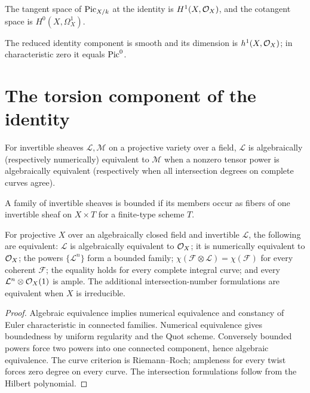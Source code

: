 \begin{proposition}\label{fga-prop-9-5-19}
The tangent space of $\operatorname{Pic}_{X/k}$ at the identity is $H^1(X,\mathcal O_X)$, and the
cotangent space is $H^0(X,\Omega_X^1)$.
\end{proposition}
\begin{proposition}\label{fga-prop-9-5-20}
The reduced identity component is smooth and its dimension is
$h^1(X,\mathcal O_X)$; in characteristic zero it equals $\operatorname{Pic}^0$.
\end{proposition}

\section{The torsion component of the identity}
\begin{definition}\label{fga-def-9-6-1}\uses{}
For invertible sheaves $\mathcal L,\mathcal M$ on a projective variety over a
field, $\mathcal L$ is algebraically (respectively numerically) equivalent to
$\mathcal M$ when a nonzero tensor power is algebraically equivalent
(respectively when all intersection degrees on complete curves agree).
\end{definition}\begin{definition}\label{fga-def-9-6-2}\uses{}
A family of invertible sheaves is bounded if its members occur as fibers of one
invertible sheaf on $X\times T$ for a finite-type scheme $T$.
\end{definition}\begin{theorem}\label{fga-thm-9-6-3}
For projective $X$ over an algebraically closed field and invertible $\mathcal L$,
the following are equivalent: $\mathcal L$ is algebraically equivalent to
$\mathcal O_X$; it is numerically equivalent to $\mathcal O_X$; the powers $\{\mathcal L^n\}$
form a bounded family; $\chi(\mathcal F\otimes\mathcal L)=\chi(\mathcal F)$
for every coherent $\mathcal F$; the equality holds for every complete integral
curve; and every $\mathcal L^n\otimes\mathcal O_X(1)$ is ample.  The additional
intersection-number formulations are equivalent when $X$ is
irreducible.
\end{theorem}
\begin{proof}
Algebraic equivalence implies numerical equivalence and constancy of Euler
characteristic in connected families.  Numerical equivalence gives boundedness
by uniform regularity and the Quot scheme.  Conversely bounded powers force two
powers into one connected component, hence algebraic equivalence.  The curve
criterion is Riemann--Roch; ampleness for every twist forces zero degree on every
curve.  The intersection formulations follow from the Hilbert polynomial.
\end{proof}
